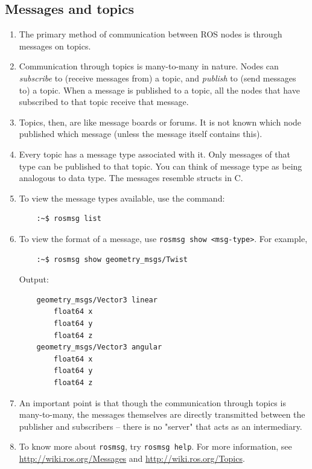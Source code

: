\documentclass{article}
\begin{document}
        \subsection{Messages and topics}
            \begin{enumerate}
                \item The primary method of communication between ROS nodes is through messages on topics.
                \item Communication through topics is many-to-many in nature. Nodes can \emph{subscribe} to (receive messages from) a topic,
                and \emph{publish} to (send messages to) a topic. When a message is published to a topic, all the nodes that have subscribed to that 
                topic receive that message.
                \item Topics, then, are like message boards or forums. It is not known which node published which message (unless the message itself contains this).
                \item Every topic has a message type associated with it. Only messages of that type can be published to that topic. You can think of message type as being analogous to data type.
                The messages resemble structs in C.
                \newpage
                \item To view the message types available, use the command:
                \begin{verbatim}
    :~$ rosmsg list
                \end{verbatim}
                \item To view the format of a message, use \texttt{rosmsg show <msg-type>}. For example,
                \begin{verbatim}
    :~$ rosmsg show geometry_msgs/Twist
                \end{verbatim}
                Output:
                \begin{verbatim}
    geometry_msgs/Vector3 linear
        float64 x
        float64 y
        float64 z
    geometry_msgs/Vector3 angular
        float64 x
        float64 y
        float64 z
                \end{verbatim}
                \item An important point is that though the communication through topics is many-to-many,
                the messages themselves are directly transmitted between the publisher and subscribers
                 -- there is no "server" that acts as an intermediary.
                
                \item To know more about \texttt{rosmsg}, try \texttt{rosmsg help}. 
                For more information, see \url{http://wiki.ros.org/Messages} and \url{http://wiki.ros.org/Topics}.
            \end{enumerate}
\end{document}
